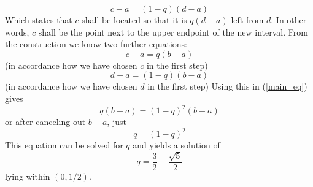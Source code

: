 \documentclass[17pt]{extarticle}
\begin{document}
\begin{equation} \label{main_eq}
c-a = (1-q)(d-a)
\end{equation}
Which states that $c$ shall be located so that it is $q(d-a)$
left from $d$. In other words, $c$ shall be the point
next to the upper endpoint of the new interval.
From the construction we know two further equations:
\begin{equation*}
	c-a=q(b-a)
\end{equation*}
(in accordance how we have chosen $c$ in the first step)
\begin{equation*}
	d-a=(1-q)(b-a)
\end{equation*}
(in accordance how we have chosen $d$ in the first step)
Using this in (\ref{main_eq}) gives
$$
q(b-a)=(1-q)^2(b-a)
$$
or after canceling out $b-a$, just
$$
q=(1-q)^2
$$
This equation can be solved for $q$ and yields a solution
of
$$
q=\frac{3}{2}-\frac{\sqrt{5}}{2}
$$
lying within $(0,1/2)$.
\end{document}
